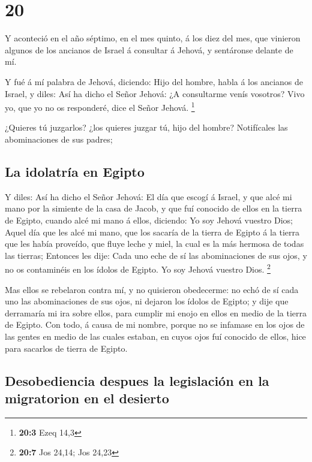 \hypertarget{section-19}{%
\section{20}\label{section-19}}

 Y aconteció en el año séptimo, en el mes quinto, á los
diez del mes, que vinieron algunos de los ancianos de Israel á consultar
á Jehová, y sentáronse delante de mí.

 Y fué á mí palabra de Jehová, diciendo: 
Hijo del hombre, habla á los ancianos de Israel, y diles: Así ha dicho
el Señor Jehová: ¿A consultarme venís vosotros? Vivo yo, que yo no os
responderé, dice el Señor Jehová. \footnote{\textbf{20:3} Ezeq 14,3}

 ¿Quieres tú juzgarlos? ¿los quieres juzgar tú, hijo del
hombre? Notifícales las abominaciones de sus padres;

\hypertarget{la-idolatruxeda-en-egipto}{%
\subsection{La idolatría en Egipto}\label{la-idolatruxeda-en-egipto}}

 Y diles: Así ha dicho el Señor Jehová: El día que escogí
á Israel, y que alcé mi mano por la simiente de la casa de Jacob, y que
fuí conocido de ellos en la tierra de Egipto, cuando alcé mi mano á
ellos, diciendo: Yo soy Jehová vuestro Dios;  Aquel día
que les alcé mi mano, que los sacaría de la tierra de Egipto á la tierra
que les había proveído, que fluye leche y miel, la cual es la más
hermosa de todas las tierras;  Entonces les dije: Cada uno
eche de sí las abominaciones de sus ojos, y no os contaminéis en los
ídolos de Egipto. Yo soy Jehová vuestro Dios. \footnote{\textbf{20:7}
  Jos 24,14; Jos 24,23}

 Mas ellos se rebelaron contra mí, y no quisieron
obedecerme: no echó de sí cada uno las abominaciones de sus ojos, ni
dejaron los ídolos de Egipto; y dije que derramaría mi ira sobre ellos,
para cumplir mi enojo en ellos en medio de la tierra de Egipto.
 Con todo, á causa de mi nombre, porque no se infamase en
los ojos de las gentes en medio de las cuales estaban, en cuyos ojos fuí
conocido de ellos, hice para sacarlos de tierra de Egipto.

\hypertarget{desobediencia-despues-la-legislaciuxf3n-en-la-migratorion-en-el-desierto}{%
\subsection{Desobediencia despues la legislación en la migratorion en el
desierto}\label{desobediencia-despues-la-legislaciuxf3n-en-la-migratorion-en-el-desierto}}

